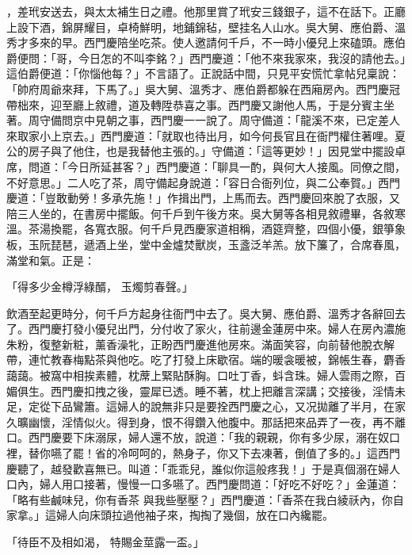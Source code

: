 ，差玳安送去，與太太補生日之禮。他那里賞了玳安三錢銀子，這不在話下。正廳上設下酒，錦屏耀目，卓椅鮮明，地鋪錦毡，壁挂名人山水。吳大舅、應伯爵、溫秀才多來的早。西門慶陪坐吃茶。使人邀請何千戶，不一時小優兒上來磕頭。應伯爵便問：「哥，今日怎的不叫李銘？」西門慶道：「他不來我家來，我沒的請他去。」這伯爵便道：「你惱他每？」不言語了。正說話中間，只見平安慌忙拿帖兒稟說：「帥府周爺來拜，下馬了。」吳大舅、溫秀才、應伯爵都躲在西廂房內。西門慶冠帶柮來，迎至廳上敘禮，道及轉陞恭喜之事。西門慶又謝他人馬，于是分賓主坐著。周守備問京中見朝之事，西門慶一一說了。周守備道：「龍溪不來，已定差人來取家小上京去。」西門慶道：「就取也待出月，如今何長官且在衙門權住著哩。夏公的房子與了他住，也是我替他主張的。」守備道：「這等更妙！」因見堂中擺設卓席，問道：「今日所延甚客？」西門慶道：「聊具一酌，與何大人接風。同僚之間，不好意思。」二人吃了茶，周守備起身說道：「容日合衙列位，與二公奉賀。」西門慶道：「豈敢動勞！多承先施！」作揖出門，上馬而去。西門慶回來脫了衣服，又陪三人坐的，在書房中擺飯。何千戶到午後方來。吳大舅等各相見敘禮畢，各敘寒溫。茶湯換罷，各寬衣服。何千戶見西慶家道相稱，酒筵齊整，四個小優，銀箏象板，玉阮琵琶，遞酒上坐，堂中金爐焚獸炭，玉盞泛羊羔。放下簾了，合席春風，滿堂和氣。正是：

「得多少金樽浮綠醑，  玉燭剪春聲。」

飲酒至起更時分，何千戶方起身往衙門中去了。吳大舅、應伯爵、溫秀才各辭回去了。西門慶打發小優兒出門，分付收了家火，往前邊金蓮房中來。婦人在房內濃施朱粉，復整新粧，薰香澡牝，正盼西門慶進他房來。滿面笑容，向前替他脫衣解帶，連忙教春梅點茶與他吃。吃了打發上床歇宿。端的暖衾暖被，錦帳生春，麝香藹藹。被窩中相挨素體，枕蓆上緊貼酥胸。口吐丁香，蚪含珠。婦人雲雨之際，百媚俱生。西門慶扣拽之後，靈犀已透。睡不著，枕上把離言深講；交接後，淫情未足，定從下品鸞簫。這婦人的說無非只是要拴西門慶之心，又况拋離了半月，在家久曠幽懷，淫情似火。得到身，恨不得鑽入他腹中。那話把來品弄了一夜，再不離口。西門慶要下床溺尿，婦人還不放，說道：「我的親親，你有多少尿，溺在奴口裡，替你嚥了罷！省的冷呵呵的，熱身子，你又下去凍著，倒值了多的。」這西門慶聽了，越發歡喜無已。叫道：「乖乖兒，誰似你這般疼我！」于是真個溺在婦人口內，婦人用口接著，慢慢一口多嚥了。西門慶問道：「好吃不好吃？」金蓮道：「略有些鹹味兒，你有香茶 與我些壓壓？」西門慶道：「香茶在我白綾祅內，你自家拿。」這婦人向床頭拉過他袖子來，掏掏了幾個，放在口內纔罷。

「待臣不及相如渴，  特賜金莖露一盃。」

